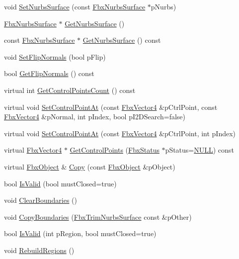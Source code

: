 \begin{DoxyCompactItemize}
\item 
void \hyperlink{class_fbx_trim_nurbs_surface_ab255a3f5402aa8adb8d834af524ac291}{Set\+Nurbs\+Surface} (const \hyperlink{class_fbx_nurbs_surface}{Fbx\+Nurbs\+Surface} $\ast$p\+Nurbs)
\item 
\hyperlink{class_fbx_nurbs_surface}{Fbx\+Nurbs\+Surface} $\ast$ \hyperlink{class_fbx_trim_nurbs_surface_a59e3a2e5a7d89476e0bbd61dcf00aede}{Get\+Nurbs\+Surface} ()
\item 
const \hyperlink{class_fbx_nurbs_surface}{Fbx\+Nurbs\+Surface} $\ast$ \hyperlink{class_fbx_trim_nurbs_surface_a3fdd293d9f7a6c950e25bd4130772236}{Get\+Nurbs\+Surface} () const
\item 
void \hyperlink{class_fbx_trim_nurbs_surface_a5f73a1d5abe4f71741ddc82fb7d003c8}{Set\+Flip\+Normals} (bool p\+Flip)
\item 
bool \hyperlink{class_fbx_trim_nurbs_surface_ae8e939290c0ab69be23fa28b6c1d8cf7}{Get\+Flip\+Normals} () const
\item 
virtual int \hyperlink{class_fbx_trim_nurbs_surface_a11c7260f31786dd8ace17769d0ccb302}{Get\+Control\+Points\+Count} () const
\item 
virtual void \hyperlink{class_fbx_trim_nurbs_surface_a8a42014521b0c91eba3554ecafe56814}{Set\+Control\+Point\+At} (const \hyperlink{class_fbx_vector4}{Fbx\+Vector4} \&p\+Ctrl\+Point, const \hyperlink{class_fbx_vector4}{Fbx\+Vector4} \&p\+Normal, int p\+Index, bool p\+I2\+D\+Search=false)
\item 
virtual void \hyperlink{class_fbx_trim_nurbs_surface_acec735094f0448ab58a48baf38c0c7ef}{Set\+Control\+Point\+At} (const \hyperlink{class_fbx_vector4}{Fbx\+Vector4} \&p\+Ctrl\+Point, int p\+Index)
\item 
virtual \hyperlink{class_fbx_vector4}{Fbx\+Vector4} $\ast$ \hyperlink{class_fbx_trim_nurbs_surface_aff21dc007688399ca91da1a9c9f6e584}{Get\+Control\+Points} (\hyperlink{class_fbx_status}{Fbx\+Status} $\ast$p\+Status=\hyperlink{fbxarch_8h_a070d2ce7b6bb7e5c05602aa8c308d0c4}{N\+U\+LL}) const
\item 
virtual \hyperlink{class_fbx_object}{Fbx\+Object} \& \hyperlink{class_fbx_trim_nurbs_surface_a4407d30e83346ab3cb30ccf67d7bb289}{Copy} (const \hyperlink{class_fbx_object}{Fbx\+Object} \&p\+Object)
\item 
bool \hyperlink{class_fbx_trim_nurbs_surface_abf1cabd0b59cd6eefb780b1ae29635b4}{Is\+Valid} (bool must\+Closed=true)
\item 
void \hyperlink{class_fbx_trim_nurbs_surface_a9b06224c2a2f1601a88a3e26f6060cab}{Clear\+Boundaries} ()
\item 
void \hyperlink{class_fbx_trim_nurbs_surface_a7d8f23447e1286c7d8476ece0561c923}{Copy\+Boundaries} (\hyperlink{class_fbx_trim_nurbs_surface}{Fbx\+Trim\+Nurbs\+Surface} const \&p\+Other)
\item 
bool \hyperlink{class_fbx_trim_nurbs_surface_aef8d884e0cf1369ea7dc01e2782f7571}{Is\+Valid} (int p\+Region, bool must\+Closed=true)
\item 
void \hyperlink{class_fbx_trim_nurbs_surface_ac233fb1ab17ead3b67615553b4b02165}{Rebuild\+Regions} ()
\end{DoxyCompactItemize}
